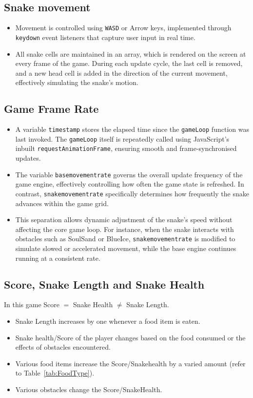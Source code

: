 \documentclass{article}
\begin{document}
    \subsection{Snake movement}
    \begin{itemize}
        \item Movement is controlled using \texttt{WASD} or Arrow keys, implemented through \texttt{keydown} event listeners that capture user input in real time.
        \item All snake cells are maintained in an array, which is rendered on the screen at every frame of the game. During each update cycle, the last cell is removed, and a new head cell is added in the direction of the current movement, effectively simulating the snake’s motion.
    \end{itemize}
    \subsection{Game Frame Rate }
    \begin{itemize}\item A variable \texttt{timestamp} stores the elapsed time since the \texttt{gameLoop} function was last invoked. The \texttt{gameLoop} itself is repeatedly called using JavaScript’s inbuilt \texttt{requestAnimationFrame}, ensuring smooth and frame-synchronised updates.

\item The variable \texttt{basemovementrate} governs the overall update frequency of the game engine, effectively controlling how often the game state is refreshed. In contrast, \texttt{snakemovementrate} specifically determines how frequently the snake advances within the game grid.

\item This separation allows dynamic adjustment of the snake’s speed without affecting the core game loop. For instance, when the snake interacts with obstacles such as SoulSand or BlueIce, \texttt{snakemovementrate} is modified to simulate slowed or accelerated movement, while the base engine continues running at a consistent rate.
    \end{itemize}

    \subsection{Score, Snake Length and Snake Health}

    In this game Score $=$ Snake Health $\neq$ Snake Length.
    \begin{itemize}
        \item Snake Length increases by one whenever a food item is eaten.
        \item Snake health/Score of the player changes based on the food consumed or the effects of obstacles encountered.
        \item Various food items increase the Score/Snakehealth by a varied amount (refer to Table~\ref{tab:FoodType}).
        \item Various obstacles change the Score/SnakeHealth.
    \end{itemize}
\end{document}
